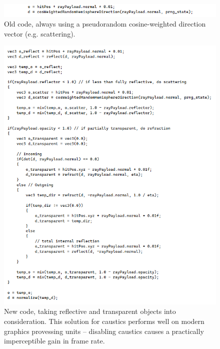 \documentclass[12pt]{article}
\begin{document}
\begin{figure} 
\centering
  \includegraphics[width = 6 in]{old_code.png}
  \caption{ Old code, always using a pseudorandom cosine-weighted direction vector (e.g. scattering).
}
\end{figure}

\begin{figure} 
\centering
  \includegraphics[width = 6 in]{code.png}
  \caption{ New code, taking reflective and transparent objects into consideration.
This solution for caustics performs well on modern graphics provessing units -- disabling caustics causes a practically imperceptible gain in frame rate.
}
\end{figure}
\end{document}
